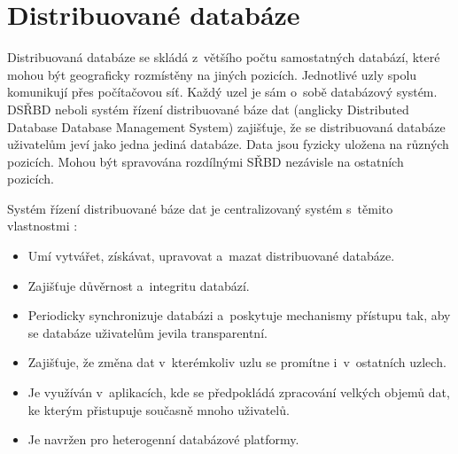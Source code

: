 
\section{Distribuované databáze}
Distribuovaná databáze se skládá z~většího počtu samostatných databází, které mohou být geograficky rozmístěny na jiných pozicích. Jednotlivé uzly spolu komunikují přes počítačovou síť. Každý uzel je sám o~sobě databázový systém. DSŘBD neboli systém řízení distribuované báze dat (anglicky Distributed Database Database Management System) zajišťuje, že se distribuovaná databáze uživatelům jeví jako jedna jediná databáze. Data jsou fyzicky uložena na různých pozicích. Mohou být spravována rozdílnými SŘBD nezávisle na ostatních pozicích.

\vspace{0.5cm}

\noindent Systém řízení distribuované báze dat je centralizovaný systém s~těmito vlastnostmi 
\cite{distributedDBMS}:

\begin{itemize}
\item Umí vytvářet, získávat, upravovat a~mazat distribuované databáze.

\item Zajišťuje důvěrnost a~integritu databází.

\item Periodicky synchronizuje databázi a~poskytuje mechanismy přístupu tak, aby se databáze uživatelům jevila transparentní.

\item Zajišťuje, že změna dat v~kterémkoliv uzlu se promítne i~v~ostatních uzlech.

\item Je využíván v~aplikacích, kde se předpokládá zpracování velkých objemů dat, ke kterým přistupuje současně mnoho uživatelů.

\item Je navržen pro heterogenní databázové platformy.
\end{itemize}

